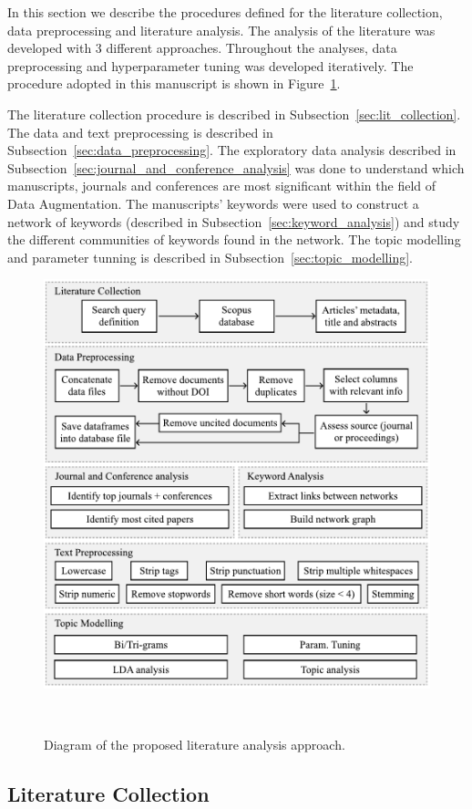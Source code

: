 \documentclass[parskip=full]{scrartcl}
\begin{document}
In this section we describe the procedures defined for the literature
collection, data preprocessing and literature analysis. The analysis of the
literature was developed with 3 different approaches. Throughout the
analyses, data preprocessing and hyperparameter tuning was developed
iteratively. The procedure adopted in this manuscript is shown in
Figure~\ref{fig:slr_diagram}.

The literature collection procedure is described in
Subsection~\ref{sec:lit_collection}. The data and text preprocessing is
described in Subsection~\ref{sec:data_preprocessing}. The exploratory data
analysis described in Subsection~\ref{sec:journal_and_conference_analysis} was
done to understand which manuscripts, journals and conferences are most
significant within the field of Data Augmentation. The manuscripts' keywords
were used to construct a network of keywords (described in
Subsection~\ref{sec:keyword_analysis}) and study the different communities of
keywords found in the network. The topic modelling and parameter tunning is described in
Subsection~\ref{sec:topic_modelling}. 

\begin{figure}[H]
	\centering
	\includegraphics[width=.75\linewidth]{../analysis/slr_diagram}
    \caption{Diagram of the proposed literature analysis approach.
    }~\label{fig:slr_diagram}
\end{figure}

\subsection{Literature Collection}~\label{sec:lit_collection}
\end{document}
